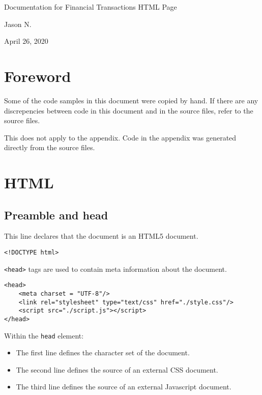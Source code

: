 \documentclass[letterpaper]{article}
\begin{document}
\vspace*{\fill}
\begin{center}
    \Large
    Documentation for Financial Transactions HTML Page

    \large
    Jason N.

    April 26, 2020
\end{center}
\vspace*{\fill}

\newpage
{}
\tableofcontents

\newpage
{}
\parskip 10pt

\section{Foreword}

Some of the code samples in this document were copied by hand.
If there are any discrepencies between code in this document and in the source files, refer to the source files.

This does not apply to the appendix.
Code in the appendix was generated directly from the source files.

\section{HTML}\label{HTML}

\subsection{Preamble and head}

This line declares that the document is an HTML5 document.

\begin{lstlisting}[firstnumber=1]
<!DOCTYPE html>
\end{lstlisting}

\lstinline{<head>} tags are used to contain meta information about the document.

\begin{lstlisting}[firstnumber=2]
<head>
    <meta charset = "UTF-8"/>
    <link rel="stylesheet" type="text/css" href="./style.css"/>
    <script src="./script.js"></script>
</head>
\end{lstlisting}

Within the \lstinline{head} element:

\begin{itemize}
    \item The first line defines the character set of the document.
    \item The second line defines the source of an external CSS document.
    \item The third line defines the source of an external Javascript document.
\end{itemize}
\end{document}
